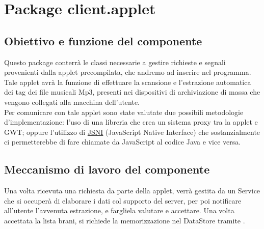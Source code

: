 \section{Package client.applet} %
\subsection*{Obiettivo e funzione del componente}
Questo package conterr\`a le classi necessarie a gestire richieste e segnali
provenienti dalla applet precompilata, che andremo ad inserire nel programma.
Tale applet avr\`a la funzione di effettuare la scansione e l'estrazione
automatica dei tag dei file musicali Mp3, presenti nei dispositivi di
archiviazione di massa che vengono collegati alla macchina dell'utente.\\
Per comunicare con tale applet sono state valutate due possibili metodologie
d'implementazione: l'uso di una libreria che crea un sistema proxy tra la applet
e GWT; oppure l'utilizzo di \underline{JSNI} (JavaScript Native Interface) che
sostanzialmente ci permetterebbe di fare chiamate da JavaScript al codice Java e
vice versa.

\subsection*{Meccanismo di lavoro del componente}
Una volta ricevuta una richiesta da parte della applet, verr\`a gestita da un
Service che si occuper\`a di elaborare i dati col supporto del server, per poi
notificare all'utente l'avvenuta estrazione, e fargliela valutare e accettare.
Una volta accettata la lista brani, si richiede la memorizzazione nel DataStore
tramite .


\newpage
